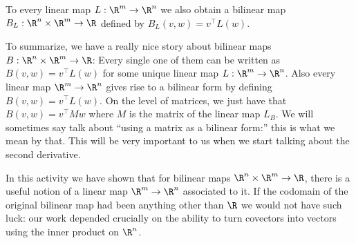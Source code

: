 \documentclass{ximera}
\begin{document}
To every linear map  $L:\R^m \to \R^n$ we also obtain a bilinear map $B_L : \R^n \times \R^m \to \R$ defined by $B_L(v,w) = v^\top L(w)$.
	
To summarize, we have a really nice story about bilinear maps $B:\R^n \times \R^m \to \R$:  Every single one of them can be written as $B(v,w) = v^\top L(w)$ for some 
unique linear map $L:\R^m \to \R^n$. Also every linear map $\R^m \to \R^n$ gives rise to a bilinear form by defining $B(v,w) = v^\top L(w)$.  On the level of matrices,
we just have that $B(v,w) = v^\top M w $ where $M$ is the matrix of the linear map $L_B$.  We will sometimes say talk about ``using a matrix as a bilinear form:''  this is what we
mean by that.  This will be very important to us when we start talking about the second derivative.
	
In this activity we have shown that for bilinear maps $\R^n \times \R^m \to \R$, there is a useful notion of a linear map $\R^m \to \R^n$ associated to it.  
If the codomain of the original bilinear map had been anything other than $\R$ we would not have such luck: our work depended crucially on
the ability to turn covectors into vectors using the inner product on $\R^n$.
\end{document}
